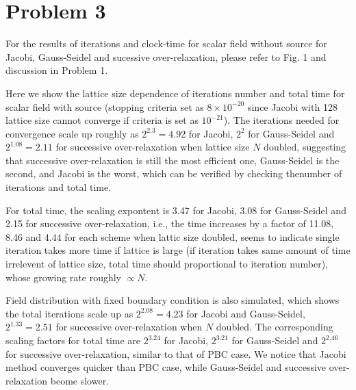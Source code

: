 \documentclass[a4paper,10pt]{article}
\begin{document}
\section*{Problem 3}
\begin{large}
For the results of iterations and clock-time for scalar field without source for Jacobi, Gauss-Seidel and sucessive over-relaxation, please refer to Fig. 1 and discussion in Problem 1. 

Here we show the lattice size dependence of iterations number and total time for scalar field with source (stopping criteria set as $8\times10^{-20}$ since Jacobi with 128 lattice size cannot converge if criteria is set as $10^{-21}$). The iterations needed for convergence scale up roughly as $2^{2.3}=4.92$ for Jacobi, $2^{2}$ for Gauss-Seidel and $2^{1.08}=2.11$ for successive over-relaxation when lattice size $N$ doubled, suggesting that successive over-relaxation is still the most efficient one, Gauss-Seidel is the second, and Jacobi is the worst, which can be verified by checking thenumber of iterations and total time.

For total time, the scaling expontent is 3.47 for Jacobi, 3.08 for Gauss-Seidel and 2.15 for successive over-relaxation, i.e., the time increases by a factor of 11.08, 8.46 and 4.44 for each scheme when lattic size doubled, seems to indicate single iteration takes more time if lattice is large (if iteration takes same amount of time irrelevent of lattice size, total time should proportional to iteration number), whose growing rate roughly $\propto N$.  

Field distribution with fixed boundary condition is also simulated, which shows the total iterations scale up as $2^{2.08}=4.23$ for Jacobi and Gauss-Seidel, $2^{1.33}=2.51$ for successive over-relaxation when $N$ doubled. The corresponding scaling factors for total time are $2^{3.24}$ for Jacobi, $2^{3.21}$ for Gauss-Seidel and $2^{2.46}$ for successive over-relaxation, similar to that of PBC case. We notice that Jacobi method converges quicker than PBC case, while Gauss-Seidel and successive over-relaxation beome slower.


\end{large}
\end{document}
